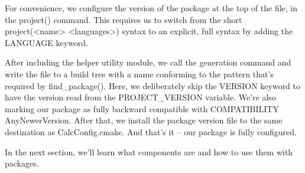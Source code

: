 For convenience, we configure the version of the package at the top of the file, in the project() command. This requires us to switch from the short project(<name> <languages>) syntax to an explicit, full syntax by adding the LANGUAGE keyword.

After including the helper utility module, we call the generation command and write the file to a build tree with a name conforming to the pattern that's required by find\_package(). Here, we deliberately skip the VERSION keyword to have the version read from the PROJECT\_VERSION variable. We're also marking our package as fully backward compatible with COMPATIBILITY AnyNewerVersion. After that, we install the package version file to the same destination as CalcConfig.cmake. And that's it – our package is fully configured.

In the next section, we'll learn what components are and how to use them with packages.







